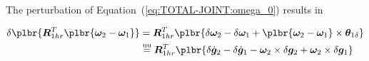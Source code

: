\documentclass[10pt,fleqn,subeqn]{report}
\newcommand{\T}[1]{\bm{#1}}
\newcommand{\TT}[1]{\bm{#1}}
\newcommand{\equu}{\overset{\text{uu}}{=}}
\begin{document}
The perturbation of Equation~(\ref{eq:TOTAL-JOINT:omega_0}) results in

\begin{align}
	\delta\plbr{
		\TT{R}_{1hr}^T \plbr{
			\T{\omega}_2 - \T{\omega}_1
		}
	}
	&=
	\TT{R}_{1hr}^T \plbr{
		\delta \T{\omega}_2
		-
		\delta \T{\omega}_1
		+
		\plbr{
			\T{\omega}_2 - \T{\omega}_1
		} \times \T{\theta}_{1\delta}
	}
	\nonumber \\
	&\equu
	\TT{R}_{1hr}^T \plbr{
		\delta\dot{\T{g}}_2
		-
		\delta\dot{\T{g}}_1
		-
		\T{\omega}_2 \times \delta\T{g}_2
		+
		\T{\omega}_2 \times \delta\T{g}_1
	}
\end{align}
\end{document}
